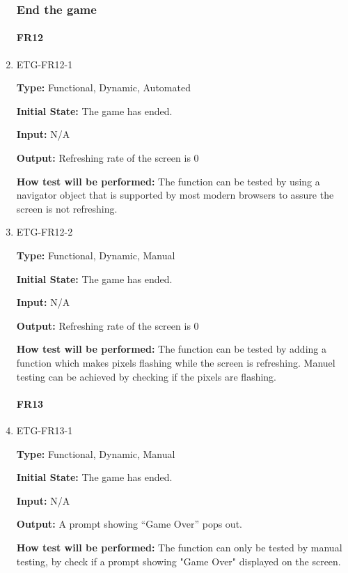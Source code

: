 \documentclass[12pt, titlepage]{article}
\begin{document}
\begin{enumerate}
\subsubsection{End the game}

\paragraph{FR12}
			

\item{ETG-FR12-1\\}

\textbf{Type:} Functional, Dynamic, Automated

\textbf{Initial State:} The game has ended.

\textbf{Input:} N/A

\textbf{Output:} Refreshing rate of the screen is 0 

\textbf{How test will be performed:} The function can be tested by using a navigator object that is supported by most modern browsers to assure the screen is not refreshing.  



\item{ETG-FR12-2\\}

\textbf{Type:} Functional, Dynamic, Manual

\textbf{Initial State:} The game has ended.

\textbf{Input:} N/A

\textbf{Output:} Refreshing rate of the screen is 0 

\textbf{How test will be performed:} The function can be tested by adding a function which makes pixels flashing while the screen is refreshing. Manuel testing can be achieved by checking if the pixels are flashing.

\paragraph{FR13}
\item{ETG-FR13-1\\}

\textbf{Type:} Functional, Dynamic, Manual

\textbf{Initial State:} The game has ended.

\textbf{Input:} N/A

\textbf{Output:} A prompt showing ``Game Over'' pops out.

\textbf{How test will be performed:} The function can only be tested by manual testing, by check if a prompt showing "Game Over" displayed on the screen.


\end{enumerate}
\end{document}
